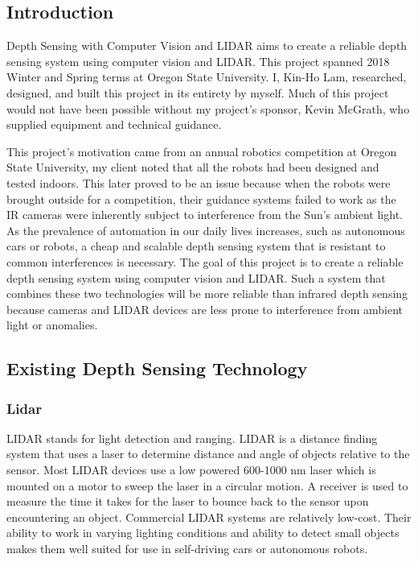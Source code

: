 \documentclass[onecolumn, draftclsnofoot,10pt, compsoc]{IEEEtran}
\begin{document}
\begin{singlespace}
	\section{Introduction}
		Depth Sensing with Computer Vision and LIDAR aims to create a reliable depth sensing system using computer vision and LIDAR. 
		This project spanned 2018 Winter and Spring terms at Oregon State University.
		I, Kin-Ho Lam, researched, designed, and built this project in its entirety by myself. 
		Much of this project would not have been possible without my project's sponsor, Kevin McGrath, who supplied equipment and technical guidance.
		

		This project's motivation came from an annual robotics competition at Oregon State University, my client noted that all the robots had been designed and tested indoors.
		This later proved to be an issue because when the robots were brought outside for a competition, their guidance systems failed to work as the IR cameras were inherently subject to interference from the Sun's ambient light.
		As the prevalence of automation in our daily lives increases, such as autonomous cars or robots, a cheap and scalable depth sensing system that is resistant to common interferences is necessary.
		The goal of this project is to create a reliable depth sensing system using computer vision and LIDAR.
		Such a system that combines these two technologies will be more reliable than infrared depth sensing because cameras and LIDAR devices are less prone to interference from ambient light or anomalies.

	\subsection{Existing Depth Sensing Technology}
		\subsubsection{Lidar}
			LIDAR stands for light detection and ranging.
			LIDAR is a distance finding system that uses a laser to determine distance and angle of objects relative to the sensor.
			Most LIDAR devices use a low powered 600-1000 nm laser which is mounted on a motor to sweep the laser in a circular motion.
			A receiver is used to measure the time it takes for the laser to bounce back to the sensor upon encountering an object.
			Commercial LIDAR systems are relatively low-cost.
			Their ability to work in varying lighting conditions and ability to detect small objects makes them well suited for use in self-driving cars or autonomous robots. \cite{lidar-uk}


\end{singlespace}
\end{document}
